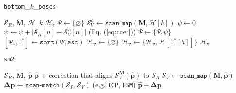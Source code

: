\begin{algorithm}[]
  \caption{\texttt{bottom}\_$k$\_\texttt{poses}}
  \begin{spacing}{1.2}
  \begin{algorithmic}[1]
    \REQUIRE $\mathcal{S}_R$, $\bm{M}$, $\mathcal{H}$, $k$
    \ENSURE $\mathcal{H}_{\triangledown}$
    \STATE $\Psi \leftarrow \{\varnothing \}$
      \STATE $\mathcal{S}_V^{\hspace{1pt} h} \leftarrow \texttt{scan\_map}(\bm{M}, \mathcal{H}[h])$
      \STATE $\psi \leftarrow 0$
        \STATE $\psi \leftarrow \psi + \big|\mathcal{S}_R[n]-\mathcal{S}_V^{\hspace{1pt} h}[n]\big|$ \hfill {\small (Eq. (\ref{eq:caer})})
      \ENDFOR
      \STATE $\Psi \leftarrow \{\Psi, \psi\}$
    \ENDFOR
    \STATE $[\Psi_{\uparrow}, \texttt{I}^{\ast}] \leftarrow \texttt{sort}(\Psi, \texttt{asc})$
    \STATE $\mathcal{H}_{\triangledown} \leftarrow \{\varnothing \}$
      \STATE $\mathcal{H}_{\triangledown} \leftarrow \{\mathcal{H}_{\triangledown}, \mathcal{H}[\texttt{I}^{\ast}[h]]\}$
    \ENDFOR
    \RETURN $\mathcal{H}_{\triangledown}$
  \end{algorithmic}
  \end{spacing}
  \label{alg:bottom_k}
\end{algorithm}

\begin{algorithm}[]
  \caption{\texttt{sm2}}
  \begin{spacing}{1.2}
  \begin{algorithmic}[1]
    \REQUIRE $\mathcal{S}_R$, $\bm{M}$, $\hat{\bm{p}}$
    \ENSURE $\hat{\bm{p}}$ $+$ correction that aligns $\mathcal{S}_V^{\bm{M}}(\hat{\bm{p}})$ to $\mathcal{S}_R$
    \STATE $\mathcal{S}_V \leftarrow \texttt{scan\_map}(\bm{M}, \hat{\bm{p}})$
    \STATE $\bm{\Delta p} \leftarrow \texttt{scan-match}(\mathcal{S}_R,\mathcal{S}_V)$ \hfill {\small (e.g. \texttt{ICP}\cite{Vizzo2023}, \texttt{FSM}\cite{Filotheou2022f}})
    \RETURN $\hat{\bm{p}} + \bm{\Delta p}$
  \end{algorithmic}
  \end{spacing}
  \label{alg:sm2}
\end{algorithm}



